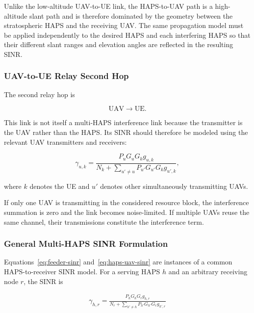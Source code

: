\documentclass[conference]{IEEEtran}
\begin{document}
Unlike the low-altitude UAV-to-UE link, the HAPS-to-UAV path is a high-altitude slant path and is therefore dominated by the geometry between the stratospheric HAPS and the receiving UAV. The same propagation model must be applied independently to the desired HAPS and each interfering HAPS so that their different slant ranges and elevation angles are reflected in the resulting SINR.

\subsubsection{UAV-to-UE Relay Second Hop}

The second relay hop is

\begin{equation}
\mathrm{UAV}\rightarrow\mathrm{UE}.
\end{equation}

This link is not itself a multi-HAPS interference link because the transmitter is the UAV rather than the HAPS. Its SINR should therefore be modeled using the relevant UAV transmitters and receivers:

\begin{equation}
\gamma_{u,k}
=
\frac{
P_uG_uG_k g_{u,k}
}{
N_k + \displaystyle\sum_{u'\neq u}
P_{u'}G_{u'}G_k g_{u',k}
},
\label{eq:uav-ue-sinr}
\end{equation}

where $k$ denotes the UE and $u'$ denotes other simultaneously transmitting UAVs.

If only one UAV is transmitting in the considered resource block, the interference summation is zero and the link becomes noise-limited. If multiple UAVs reuse the same channel, their transmissions constitute the interference term.

\subsubsection{General Multi-HAPS SINR Formulation}

Equations~\eqref{eq:feeder-sinr} and~\eqref{eq:haps-uav-sinr} are instances of a common HAPS-to-receiver SINR model. For a serving HAPS $h$ and an arbitrary receiving node $r$, the SINR is

\begin{equation}
\boxed{
\begin{aligned}
\gamma_{h,r}
=
\frac{
P_hG_hG_r g_{h,r}
}{
N_r + \displaystyle\sum_{h'\neq h}
P_{h'}G_{h'}G_r g_{h',r}
}
\end{aligned}
}
\label{eq:general-haps-sinr}
\end{equation}
\end{document}
